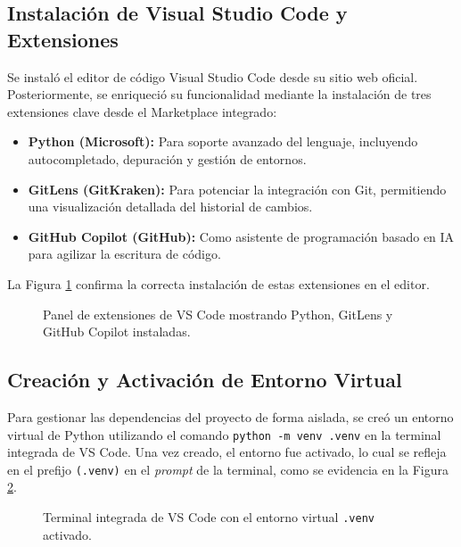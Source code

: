 \documentclass[12pt,a4paper]{article}
\begin{document}
\subsection{Instalación de Visual Studio Code y Extensiones}
Se instaló el editor de código Visual Studio Code desde su sitio web oficial. Posteriormente, se enriqueció su funcionalidad mediante la instalación de tres extensiones clave desde el Marketplace integrado:

\begin{itemize}
    \item \textbf{Python (Microsoft):} Para soporte avanzado del lenguaje, incluyendo autocompletado, depuración y gestión de entornos.
    \item \textbf{GitLens (GitKraken):} Para potenciar la integración con Git, permitiendo una visualización detallada del historial de cambios.
    \item \textbf{GitHub Copilot (GitHub):} Como asistente de programación basado en IA para agilizar la escritura de código.
\end{itemize}

La Figura \ref{fig:vscode_extensiones} confirma la correcta instalación de estas extensiones en el editor.

\begin{figure}[H]
    \centering
    \caption{Panel de extensiones de VS Code mostrando Python, GitLens y GitHub Copilot instaladas.}
    \label{fig:vscode_extensiones}
\end{figure}

\subsection{Creación y Activación de Entorno Virtual}
Para gestionar las dependencias del proyecto de forma aislada, se creó un entorno virtual de Python utilizando el comando \texttt{python -m venv .venv} en la terminal integrada de VS Code. Una vez creado, el entorno fue activado, lo cual se refleja en el prefijo \texttt{(.venv)} en el \textit{prompt} de la terminal, como se evidencia en la Figura \ref{fig:venv_activado}.

\begin{figure}[H]
    \centering
    \caption{Terminal integrada de VS Code con el entorno virtual \texttt{.venv} activado.}
    \label{fig:venv_activado}
\end{figure}
\end{document}
